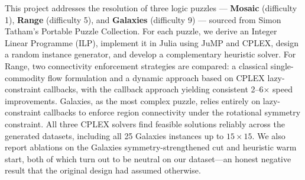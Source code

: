 This project addresses the resolution of three logic puzzles --- \textbf{Mosaic} (difficulty 1), \textbf{Range} (difficulty 5), and \textbf{Galaxies} (difficulty 9) --- sourced from Simon Tatham's Portable Puzzle Collection. For each puzzle, we derive an Integer Linear Programme (ILP), implement it in Julia using JuMP and CPLEX, design a random instance generator, and develop a complementary heuristic solver. For Range, two connectivity enforcement strategies are compared: a classical single-commodity flow formulation and a dynamic approach based on CPLEX lazy-constraint callbacks, with the callback approach yielding consistent 2--6$\times$ speed improvements. Galaxies, as the most complex puzzle, relies entirely on lazy-constraint callbacks to enforce region connectivity under the rotational symmetry constraint. All three CPLEX solvers find feasible solutions reliably across the generated datasets, including all 25 Galaxies instances up to $15 \times 15$. We also report ablations on the Galaxies symmetry-strengthened cut and heuristic warm start, both of which turn out to be neutral on our dataset---an honest negative result that the original design had assumed otherwise.
